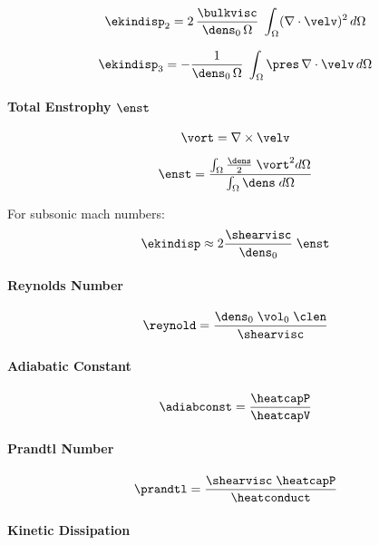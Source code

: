 \begin{equation}
\label{eq:ekindisp2}
    \ekindisp_2 = 2\,\frac{\bulkvisc}{\dens_0\,\Omega} \; \int_\Omega (\nabla \cdot \velv)^2 \, d\Omega
\end{equation}

\begin{equation}
\label{eq:ekindisp3}
    \ekindisp_3 = -\frac{1}{\dens_0\,\Omega} \; \int_\Omega \pres \, \nabla \cdot \velv \, d\Omega
\end{equation}

\paragraph{Total Enstrophy $\enst$}

\begin{equation}
\label{eq:vort}
    \vort = \nabla \times \velv
\end{equation}

\begin{equation}
\label{eq:enst}
    \enst = \frac{\int_\Omega \frac{\dens}{2} \; \vort^2 d\Omega}{\int_\Omega \dens \; d\Omega}
\end{equation}

For subsonic mach numbers:
\begin{equation}
\label{eq:ekindisp2}
    \ekindisp \approx 2 \frac{\shearvisc}{\dens_0} \; \enst
\end{equation}

\paragraph{Reynolds Number}

\begin{equation}
\label{eq:reynold}
    \reynold = \frac{\dens_0\;\vol_0\;\clen}{\shearvisc}
\end{equation}

\paragraph{Adiabatic Constant}
\begin{equation}
\label{eq:adiabconst}
    \adiabconst = \frac{\heatcapP}{\heatcapV}
\end{equation}

\paragraph{Prandtl Number}
\begin{equation}
\label{eq:prandtl}
    \prandtl = \frac{\shearvisc \; \heatcapP}{\heatconduct}
\end{equation}

\paragraph{Kinetic Dissipation}
